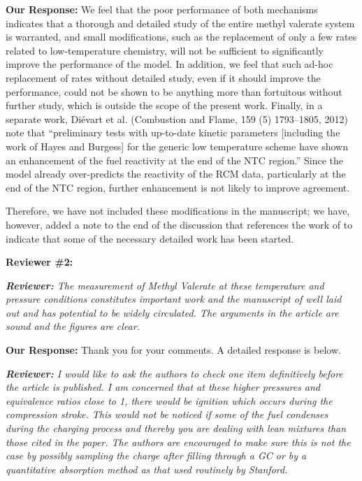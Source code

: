 \documentclass{article}
\newenvironment{reviewer}{\vspace{0.5\baselineskip}\begingroup\itshape\textbf{Reviewer:}}{\endgroup\vspace{0.5\baselineskip}}
\newenvironment{response}{\vspace{0.5\baselineskip}\textbf{Our Response:}}{\vspace{0.5\baselineskip}}
\begin{document}
\begin{response}
    We feel that the poor performance of both mechanisms indicates that a thorough and detailed
    study of the entire methyl valerate system is warranted, and small modifications, such as the
    replacement of only a few rates related to low-temperature chemistry, will not be sufficient to
    significantly improve the performance of the model. In addition, we feel that such ad-hoc
    replacement of rates without detailed study, even if it should improve the performance, could
    not be shown to be anything more than fortuitous without further study, which is outside the
    scope of the present work. Finally, in a separate work, Di\'{e}vart et al. (Combustion and
    Flame, 159 (5) 1793--1805, 2012) note that ``preliminary tests with up-to-date kinetic
    parameters [including the work of Hayes and Burgess] for the generic low temperature scheme have
    shown an enhancement of the fuel reactivity at the end of the NTC region.'' Since the model
    already over-predicts the reactivity of the RCM data, particularly at the end of the NTC region,
    further enhancement is not likely to improve agreement.

    Therefore, we have not included these modifications in the manuscript; we have, however, added a
    note to the end of the discussion that references the work of \citet{Hayes2009} to indicate that
    some of the necessary detailed work has been started.
\end{response}

\newpage

\noindent \textbf{Reviewer \#2:}

\begin{reviewer}
    The measurement of Methyl Valerate at these temperature and pressure conditions constitutes
    important work and the manuscript of well laid out and has potential to be widely circulated.
    The arguments in the article are sound and the figures are clear.
\end{reviewer}

\begin{response}
    Thank you for your comments. A detailed response is below.
\end{response}

\begin{reviewer}
    I would like to ask the authors to check one item definitively before the article is published.
    I am concerned that at these higher pressures and equivalence ratios close to 1, there would be
    ignition which occurs during the compression stroke. This would not be noticed if some of the
    fuel condenses during the charging process and thereby you are dealing with lean mixtures than
    those cited in the paper. The authors are encouraged to make sure this is not the case by
    possibly sampling the charge after filling through a GC or by a quantitative absorption method
    as that used routinely by Stanford.
\end{reviewer}
\end{document}
